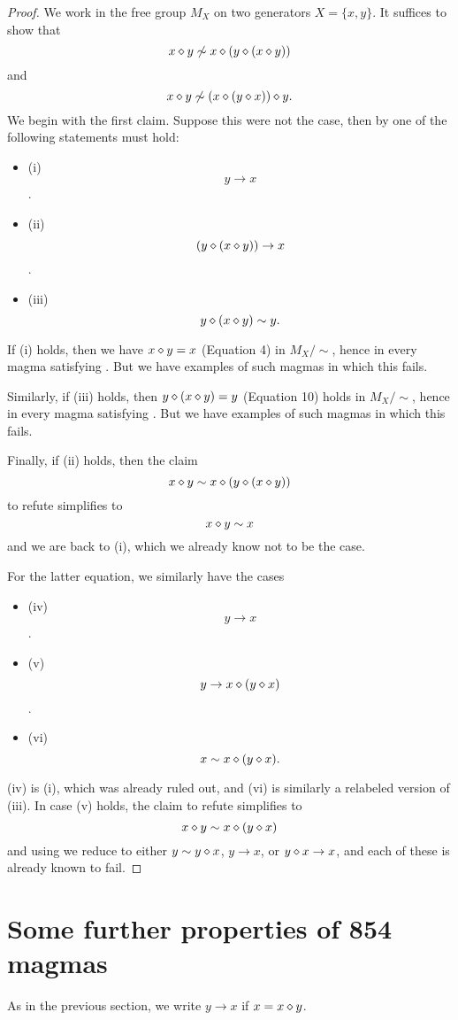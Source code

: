 \begin{proof}
  We work in the free group $M_X$ on two generators $X = \{x,y\}$.  It suffices to show that
$$  x \diamond y \not \sim x \diamond (y \diamond (x \diamond y))$$
and
$$
x \diamond y \not \sim (x \diamond (y \diamond x)) \diamond y.$$
We begin with the first claim.  Suppose this were not the case, then by  one of the following statements must hold:
\begin{itemize}
\item (i) $$y \to x$$.
\item (ii) $$(y \diamond (x \diamond y)) \to x$$.
\item (iii) $$y \diamond (x \diamond y) \sim y.$$
\end{itemize}
If (i) holds, then we have $x \diamond y = x$ (Equation 4) in $M_X/\sim$, hence in every magma satisfying .  But we have examples of such magmas in which this fails.

Similarly, if (iii) holds, then $y \diamond (x \diamond y) = y$ (Equation 10) holds in $M_X/\sim$, hence in every magma satisfying .  But we have examples of such magmas in which this fails.

Finally, if (ii) holds, then the claim
$$  x \diamond y \sim x \diamond (y \diamond (x \diamond y))$$
to refute simplifies to
$$  x \diamond y \sim x$$
and we are back to (i), which we already know not to be the case.

For the latter equation, we similarly have the cases
\begin{itemize}
  \item (iv) $$y \to x$$.
  \item (v) $$y \to x \diamond (y \diamond x)$$.
  \item (vi) $$x \sim x \diamond (y \diamond x).$$
  \end{itemize}
(iv) is (i), which was already ruled out, and (vi) is similarly a relabeled version of (iii). In case (v) holds, the claim to refute simplifies to
$$
x \diamond y \sim x \diamond (y \diamond x)$$
and using  we reduce to either $y \sim y \diamond x$, $y \to x$, or $y \diamond x \to x$, and each of these is already known to fail.
\end{proof}

\section{Some further properties of 854 magmas}

As in the previous section, we write $y \to x$ if $x = x \diamond y$.

